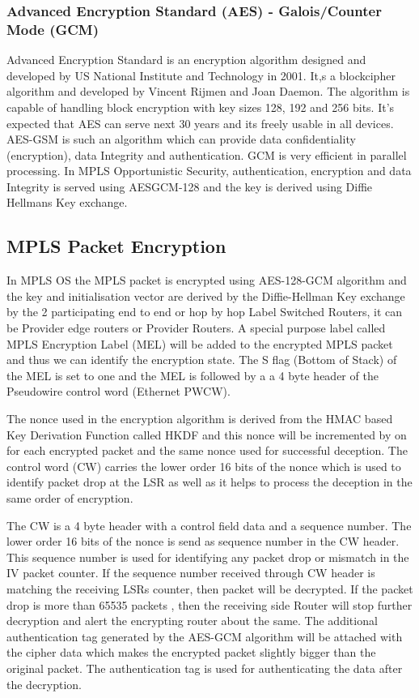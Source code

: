 \subsubsection{Advanced Encryption Standard (AES) - Galois/Counter Mode (GCM)}



Advanced Encryption Standard\cite{robertazzi_2011}\cite{denis_johnson_2007} is an encryption algorithm designed and developed by US National Institute and Technology in 2001. It,s a blockcipher algorithm and developed by Vincent Rijmen and Joan Daemon. The algorithm is capable of handling block encryption with key sizes 128, 192 and 256 bits. It’s expected that AES can serve next 30 years and its freely usable in all devices. AES-GSM is such an algorithm which can provide data confidentiality (encryption), data Integrity and authentication. GCM is very efficient in parallel processing. In MPLS Opportunistic Security, authentication, encryption and data Integrity is served using AESGCM-128 and the key is derived using Diffie Hellmans Key exchange.

\subsection{MPLS Packet Encryption} 

In MPLS OS the MPLS packet is encrypted using AES-128-GCM algorithm and the key and initialisation vector are derived by the Diffie-Hellman Key exchange by the 2 participating end to end or hop by hop Label Switched Routers, it can be Provider edge routers or Provider Routers. A special purpose label called MPLS Encryption Label (MEL) will be added to the encrypted MPLS packet and thus we can identify the encryption state. The S flag (Bottom of Stack) of the MEL is set to one and the MEL is followed by a a 4 byte header of the Pseudowire control word (Ethernet PWCW).

The nonce used in the encryption algorithm is derived from the HMAC based Key Derivation Function called HKDF and this nonce will be incremented by on for each encrypted packet and the same nonce used for successful deception. The control word (CW) carries the lower order 16 bits of the nonce which is used to identify packet drop at the LSR as well as it helps to process the deception in the same order of encryption. 

The CW is a 4 byte header with a control field data and a sequence number. The lower order 16 bits of the nonce is send as sequence number in the CW header. This sequence number is used for identifying any packet drop or mismatch in the IV packet counter. If the sequence number received through CW header is matching the receiving LSRs counter, then packet will be decrypted. If the packet drop is more than 65535 packets , then the receiving side Router will stop further decryption and alert the encrypting router about the same. The additional authentication tag generated by the AES-GCM algorithm will be attached with the cipher data which makes the encrypted packet slightly bigger than the original packet. The authentication tag is used for authenticating the data after the decryption.


